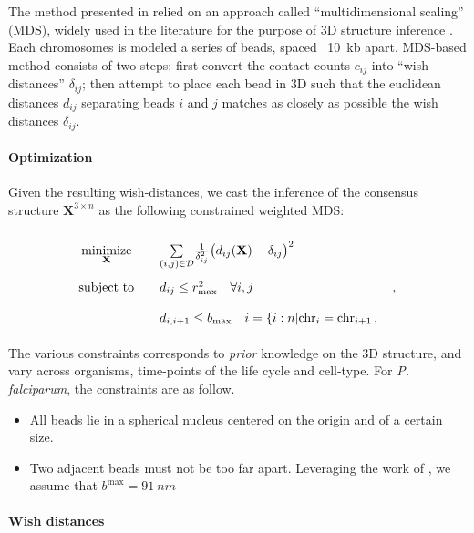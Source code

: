 \documentclass[letterpaper,12pt]{article}
\begin{document}
The method presented in \citet{ay:three-dimensional} relied on an
approach called ``multidimensional scaling'' (MDS), widely used in the
literature for the purpose of 3D structure inference
\citep{duan:three-dimensional, varoquaux:statistical, bau:, tanizawa:}. Each chromosomes is
modeled a series of beads, spaced ~10~kb apart. MDS-based method consists of
two steps: first convert the
contact counts $c_{ij}$ into ``wish-distances'' $\delta_{ij}$; then attempt
to place each bead in 3D such that the euclidean distances $d_{ij}$ separating
beads $i$ and $j$ matches as closely as possible the wish distances
$\delta_{ij}$.

\paragraph{Optimization}

Given the resulting wish-distances, we cast the inference of the consensus
structure $\mathbf{X}^{3 \times n}$ as the following constrained weighted MDS:


\begin{equation}\label{eq:mds1} 
\renewcommand{\arraystretch}{2} 
\begin{array}{ccll} 
\underset{\mathbf{X}}{\text{minimize}} & & 
\underset{(i,j) \in \mathcal{D}}{\sum} \frac{1}{\delta^2_{ij}}
\big(d_{ij}(\mathbf{X}) - \delta_{ij}\big)^2 & \\
\text{subject to} & & d_{ij} \leq r^2_\text{max} \quad \forall i, j &\,,\\
& & d_{i, i+1} \leq b_\text{max} \quad i = \{i:n|\text{chr}_i = \text{chr}_{i+1}\,,&\\ 
\end{array} 
\end{equation}

The various constraints corresponds to {\em prior} knowledge on the 3D
structure, and vary across organisms, time-points of the life cycle and
cell-type. For {\em P. falciparum}, the constraints are as follow.

\begin{itemize}
\item All beads lie in a spherical nucleus centered on the origin and of a
certain size.
\item Two adjacent beads must not be too far apart. Leveraging the work of
\citet{berger:high TOVERIFY}, we assume that $b^\text{max} = 91~nm$
\end{itemize}

\paragraph{Wish distances}
\end{document}
